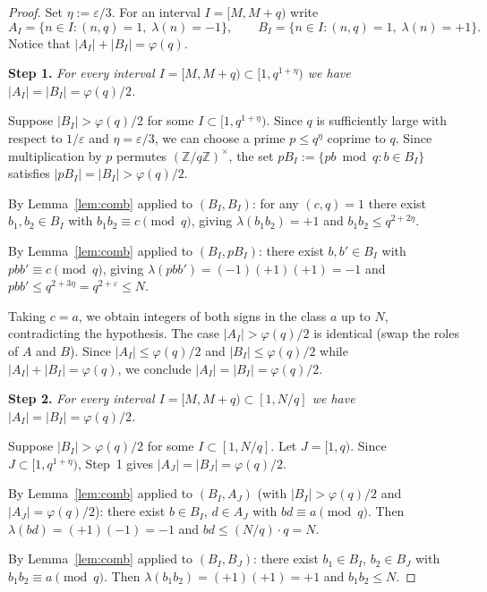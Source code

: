 \documentclass[11pt]{amsart}
\begin{document}
\begin{proof}
Set $\eta := \varepsilon/3$.
For an interval $I = [M, M + q)$ write
\[
A_I = \{n \in I : (n, q) = 1,\; \lambda(n) = -1\},
\qquad
B_I = \{n \in I : (n, q) = 1,\; \lambda(n) = +1\}.
\]
Notice that $|A_I| + |B_I| = \varphi(q)$.

\medskip
\noindent\textbf{Step 1.}
\textit{For every interval $I = [M, M+q) \subset [1, q^{1+\eta})$
we have $|A_I| = |B_I| = \varphi(q)/2$.}

\smallskip
Suppose $|B_I| > \varphi(q)/2$ for some
$I \subset [1, q^{1 + \eta})$. Since $q$ is sufficiently large
with respect to $1/\varepsilon$ and $\eta = \varepsilon / 3$,
we can choose a prime $p \leq q^{\eta}$ coprime to $q$.
Since multiplication by $p$ permutes
$(\mathbb{Z}/q\mathbb{Z})^{\times}$,
the set $pB_I := \{pb \bmod q : b \in B_I\}$
satisfies $|pB_I| = |B_I| > \varphi(q)/2$.

By Lemma~\ref{lem:comb} applied to $(B_I, B_I)$:
for any $(c, q) = 1$ there exist
$b_1, b_2 \in B_I$ with $b_1 b_2 \equiv c \pmod{q}$,
giving $\lambda(b_1 b_2) = +1$ and
$b_1 b_2 \leq q^{2 + 2\eta}$.

By Lemma~\ref{lem:comb} applied to $(B_I, pB_I)$:
there exist $b, b' \in B_I$ with
$pbb' \equiv c \pmod{q}$, giving
$\lambda(pbb') = (-1)(+1)(+1) = -1$ and
$pbb' \leq q^{2 + 3\eta} = q^{2 + \varepsilon} \leq N$.

Taking $c = a$, we obtain integers of both signs in the
class $a$ up to $N$, contradicting the hypothesis.
The case $|A_I| > \varphi(q)/2$ is identical
(swap the roles of $A$ and $B$).
Since $|A_I| \leq \varphi(q)/2$ and $|B_I| \leq \varphi(q)/2$
while $|A_I| + |B_I| = \varphi(q)$,
we conclude $|A_I| = |B_I| = \varphi(q)/2$.

\medskip
\noindent\textbf{Step 2.}
\textit{For every interval $I = [M, M+q) \subset [1, N/q]$
we have $|A_I| = |B_I| = \varphi(q)/2$.}

\smallskip
Suppose $|B_I| > \varphi(q)/2$ for some
$I \subset [1, N/q]$.
Let $J = [1, q)$.
Since $J \subset [1, q^{1 + \eta})$,
Step~1 gives $|A_J| = |B_J| = \varphi(q)/2$.

By Lemma~\ref{lem:comb} applied to $(B_I, A_J)$
(with $|B_I| > \varphi(q)/2$ and $|A_J| = \varphi(q)/2$):
there exist $b \in B_I$, $d \in A_J$
with $bd \equiv a \pmod{q}$.
Then $\lambda(bd) = (+1)(-1) = -1$ and
$bd \leq (N/q) \cdot q = N$.

By Lemma~\ref{lem:comb} applied to $(B_I, B_J)$:
there exist $b_1 \in B_I$, $b_2 \in B_J$ with
$b_1 b_2 \equiv a \pmod{q}$.
Then $\lambda(b_1 b_2) = (+1)(+1) = +1$ and
$b_1 b_2 \leq N$.


\end{proof}
\end{document}
